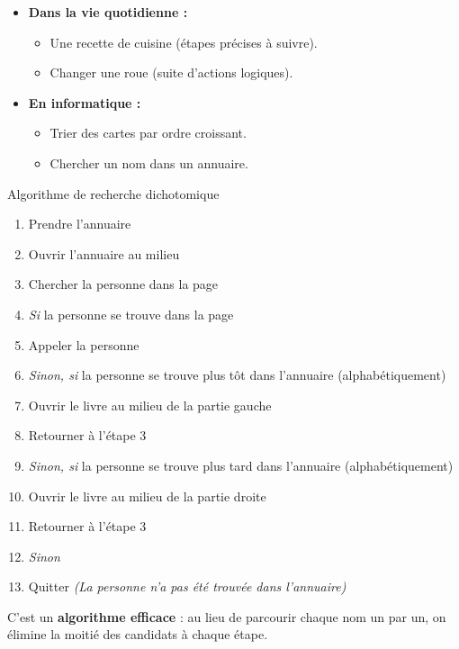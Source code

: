 \begin{itemize}
	\item \textbf{Dans la vie quotidienne :}
	      \begin{itemize}
		      \item Une recette de cuisine (étapes précises à suivre).
		      \item Changer une roue (suite d’actions logiques).
	      \end{itemize}
\end{itemize}

\begin{itemize}
	\item \textbf{En informatique :}
	      \begin{itemize}
		      \item Trier des cartes par ordre croissant.
		      \item Chercher un nom dans un annuaire.
	      \end{itemize}
\end{itemize}

\begin{UPSTIinfor}{Algorithme de recherche dichotomique}
	\begin{enumerate}
		\item Prendre l'annuaire
		\item Ouvrir l'annuaire au milieu
		\item Chercher la personne dans la page
		\item \textit{Si} la personne se trouve dans la page
		\item     Appeler la personne
		\item \textit{Sinon, si} la personne se trouve plus tôt dans l'annuaire (alphabétiquement)
		\item     Ouvrir le livre au milieu de la partie gauche
		\item     Retourner à l'étape 3
		\item \textit{Sinon, si} la personne se trouve plus tard dans l'annuaire (alphabétiquement)
		\item     Ouvrir le livre au milieu de la partie droite
		\item     Retourner à l'étape 3
		\item \textit{Sinon}
		\item     Quitter \textit{(La personne n'a pas été trouvée dans l'annuaire)}
	\end{enumerate}
\end{UPSTIinfor}

C’est un \textbf{algorithme efficace} : au lieu de parcourir chaque nom un par un, on élimine la moitié des candidats à chaque étape.
